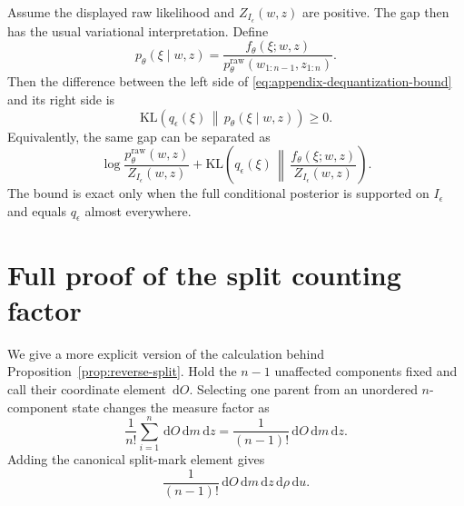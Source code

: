 \documentclass[10pt]{article}
\theoremstyle{definition}
\theoremstyle{remark}
\newcommand{\KL}{\mathrm{KL}}
\newcommand{\dd}{\,\mathrm{d}}
\begin{document}
Assume the displayed raw likelihood and $Z_{I_\epsilon}(w,z)$ are positive.
The gap then has the usual variational interpretation.  Define
\begin{equation}
  p_\theta(\xi\mid w,z)
  =\frac{f_\theta(\xi;w,z)}
  {p_\theta^{\mathrm{raw}}(w_{1:n-1},z_{1:n})}.
  \label{eq:appendix-dequantization-posterior}
\end{equation}
Then the difference between the left side of
\eqref{eq:appendix-dequantization-bound} and its right side is
\begin{equation}
  \KL\!\left(q_\epsilon(\xi)\,\middle\|\,
  p_\theta(\xi\mid w,z)\right)\geq0.
  \label{eq:appendix-dequantization-gap}
\end{equation}
Equivalently, the same gap can be separated as
\begin{equation}
  \log\frac{p_\theta^{\mathrm{raw}}(w,z)}{Z_{I_\epsilon}(w,z)}
  +\KL\!\left(
    q_\epsilon(\xi)\,\middle\|\,
    \frac{f_\theta(\xi;w,z)}{Z_{I_\epsilon}(w,z)}
  \right).
  \label{eq:appendix-dequantization-gap-split}
\end{equation}
The bound is exact only when the full conditional posterior is supported on
$I_\epsilon$ and equals $q_\epsilon$ almost everywhere.

\section{Full proof of the split counting factor}
\label{app:counting}

We give a more explicit version of the calculation behind
Proposition~\ref{prop:reverse-split}.  Hold the $n-1$ unaffected components fixed and call their coordinate element $\dd O$.  Selecting one parent from an unordered $n$-component state changes the measure factor as
\begin{equation}
  \frac{1}{n!}\sum_{i=1}^{n}\dd O\dd m\dd z
  =\frac{1}{(n-1)!}\dd O\dd m\dd z.
  \label{eq:parent-counting}
\end{equation}
Adding the canonical split-mark element gives
\begin{equation}
  \frac{1}{(n-1)!}\dd O\dd m\dd z\dd\rho\dd u.
  \label{eq:forward-split-volume}
\end{equation}
\end{document}
